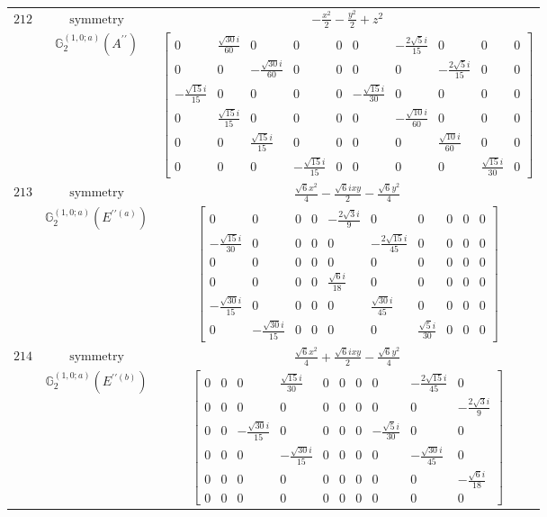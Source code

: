 \documentclass[fleqn,8pt,landscape]{jsarticle}
\begin{document}
\begin{longtable}{ccc}
$ 212 $ & $ \text{symmetry} $ & $ - \frac{x^{2}}{2} - \frac{y^{2}}{2} + z^{2} $ \\
$  $ & $ \mathbb{G}_{2}^{(1,0;a)}(A^{\prime\prime}) $ & $ \begin{bmatrix} 0 & \frac{\sqrt{30} i}{60} & 0 & 0 & 0 & 0 & - \frac{2 \sqrt{5} i}{15} & 0 & 0 & 0 \\ 0 & 0 & - \frac{\sqrt{30} i}{60} & 0 & 0 & 0 & 0 & - \frac{2 \sqrt{5} i}{15} & 0 & 0 \\ - \frac{\sqrt{15} i}{15} & 0 & 0 & 0 & 0 & - \frac{\sqrt{15} i}{30} & 0 & 0 & 0 & 0 \\ 0 & \frac{\sqrt{15} i}{15} & 0 & 0 & 0 & 0 & - \frac{\sqrt{10} i}{60} & 0 & 0 & 0 \\ 0 & 0 & \frac{\sqrt{15} i}{15} & 0 & 0 & 0 & 0 & \frac{\sqrt{10} i}{60} & 0 & 0 \\ 0 & 0 & 0 & - \frac{\sqrt{15} i}{15} & 0 & 0 & 0 & 0 & \frac{\sqrt{15} i}{30} & 0 \end{bmatrix} $ \\ \hline
$ 213 $ & $ \text{symmetry} $ & $ \frac{\sqrt{6} x^{2}}{4} - \frac{\sqrt{6} i x y}{2} - \frac{\sqrt{6} y^{2}}{4} $ \\
$  $ & $ \mathbb{G}_{2}^{(1,0;a)}(E^{\prime\prime(a)}) $ & $ \begin{bmatrix} 0 & 0 & 0 & 0 & - \frac{2 \sqrt{3} i}{9} & 0 & 0 & 0 & 0 & 0 \\ - \frac{\sqrt{15} i}{30} & 0 & 0 & 0 & 0 & - \frac{2 \sqrt{15} i}{45} & 0 & 0 & 0 & 0 \\ 0 & 0 & 0 & 0 & 0 & 0 & 0 & 0 & 0 & 0 \\ 0 & 0 & 0 & 0 & \frac{\sqrt{6} i}{18} & 0 & 0 & 0 & 0 & 0 \\ - \frac{\sqrt{30} i}{15} & 0 & 0 & 0 & 0 & \frac{\sqrt{30} i}{45} & 0 & 0 & 0 & 0 \\ 0 & - \frac{\sqrt{30} i}{15} & 0 & 0 & 0 & 0 & \frac{\sqrt{5} i}{30} & 0 & 0 & 0 \end{bmatrix} $ \\ \hline
$ 214 $ & $ \text{symmetry} $ & $ \frac{\sqrt{6} x^{2}}{4} + \frac{\sqrt{6} i x y}{2} - \frac{\sqrt{6} y^{2}}{4} $ \\
$  $ & $ \mathbb{G}_{2}^{(1,0;a)}(E^{\prime\prime(b)}) $ & $ \begin{bmatrix} 0 & 0 & 0 & \frac{\sqrt{15} i}{30} & 0 & 0 & 0 & 0 & - \frac{2 \sqrt{15} i}{45} & 0 \\ 0 & 0 & 0 & 0 & 0 & 0 & 0 & 0 & 0 & - \frac{2 \sqrt{3} i}{9} \\ 0 & 0 & - \frac{\sqrt{30} i}{15} & 0 & 0 & 0 & 0 & - \frac{\sqrt{5} i}{30} & 0 & 0 \\ 0 & 0 & 0 & - \frac{\sqrt{30} i}{15} & 0 & 0 & 0 & 0 & - \frac{\sqrt{30} i}{45} & 0 \\ 0 & 0 & 0 & 0 & 0 & 0 & 0 & 0 & 0 & - \frac{\sqrt{6} i}{18} \\ 0 & 0 & 0 & 0 & 0 & 0 & 0 & 0 & 0 & 0 \end{bmatrix} $ \\ \hline

\end{longtable}
\end{document}
